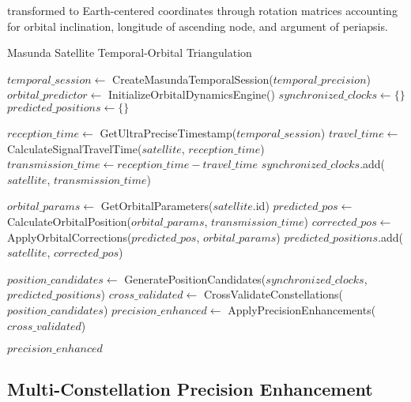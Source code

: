 \documentclass[12pt,a4paper]{article}
\begin{document}
transformed to Earth-centered coordinates through rotation matrices accounting for orbital inclination, longitude of ascending node, and argument of periapsis.

\begin{algorithm}
\caption{Masunda Satellite Temporal-Orbital Triangulation}
\begin{algorithmic}[1]
    \State $temporal\_session \gets$ CreateMasundaTemporalSession($temporal\_precision$)
    \State $orbital\_predictor \gets$ InitializeOrbitalDynamicsEngine()
    \State $synchronized\_clocks \gets \{\}$
    \State $predicted\_positions \gets \{\}$
    
        \State $reception\_time \gets$ GetUltraPreciseTimestamp($temporal\_session$)
        \State $travel\_time \gets$ CalculateSignalTravelTime($satellite$, $reception\_time$)
        \State $transmission\_time \gets reception\_time - travel\_time$
        \State $synchronized\_clocks$.add($satellite$, $transmission\_time$)
    \EndFor
    
        \State $orbital\_params \gets$ GetOrbitalParameters($satellite$.id)
        \State $predicted\_pos \gets$ CalculateOrbitalPosition($orbital\_params$, $transmission\_time$)
        \State $corrected\_pos \gets$ ApplyOrbitalCorrections($predicted\_pos$, $orbital\_params$)
        \State $predicted\_positions$.add($satellite$, $corrected\_pos$)
    \EndFor
    
    \State $position\_candidates \gets$ GeneratePositionCandidates($synchronized\_clocks$, $predicted\_positions$)
    \State $cross\_validated \gets$ CrossValidateConstellations($position\_candidates$)
    \State $precision\_enhanced \gets$ ApplyPrecisionEnhancements($cross\_validated$)
    
    \State \Return $precision\_enhanced$
\EndProcedure
\end{algorithmic}
\end{algorithm}

\subsection{Multi-Constellation Precision Enhancement}
\end{document}
